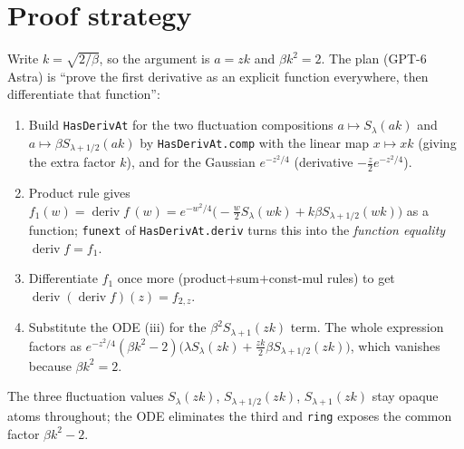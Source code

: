 \documentclass[11pt]{article}
\begin{document}
\section{Proof strategy}
Write $k=\sqrt{2/\beta}$, so the argument is $a=zk$ and $\beta k^2=2$. The plan (GPT-6 Astra) is
``prove the first derivative as an explicit function everywhere, then differentiate that function'':
\begin{enumerate}
\item Build \texttt{HasDerivAt} for the two fluctuation compositions $a\mapsto S_\lambda(ak)$ and
$a\mapsto\beta S_{\lambda+1/2}(ak)$ by \texttt{HasDerivAt.comp} with the linear map $x\mapsto xk$ (giving
the extra factor $k$), and for the Gaussian $e^{-z^2/4}$ (derivative $-\tfrac{z}{2}e^{-z^2/4}$).
\item Product rule gives $f_1(w)=\operatorname{deriv} f\,(w)=e^{-w^2/4}\bigl(-\tfrac w2S_\lambda(wk)+k\beta
S_{\lambda+1/2}(wk)\bigr)$ as a function; \texttt{funext} of \texttt{HasDerivAt.deriv} turns this into
the \emph{function equality} $\operatorname{deriv} f=f_1$.
\item Differentiate $f_1$ once more (product$+$sum$+$const-mul rules) to get $\operatorname{deriv}(\operatorname{deriv} f)(z)=f_{2,z}$.
\item Substitute the ODE (iii) for the $\beta^2S_{\lambda+1}(zk)$ term. The whole expression factors as
$e^{-z^2/4}(\beta k^2-2)\bigl(\lambda S_\lambda(zk)+\tfrac{zk}{2}\beta S_{\lambda+1/2}(zk)\bigr)$, which
vanishes because $\beta k^2=2$.
\end{enumerate}
The three fluctuation values $S_\lambda(zk)$, $S_{\lambda+1/2}(zk)$, $S_{\lambda+1}(zk)$ stay opaque
atoms throughout; the ODE eliminates the third and \texttt{ring} exposes the common factor
$\beta k^2-2$.
\end{document}
